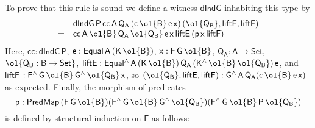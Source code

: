 \documentclass[sigplan,10pt]{acmart}
\begin{document}
To prove that this rule is sound we define a witness
$\mathsf{dIndG}$ inhabiting this type by
\[\begin{array}{ll}
 & \mathsf{dIndG\,P\,cc\,A\,Q_A\,(c\,\ol{B}\,e\,x)\,(\ol{Q_B}, liftE, liftF)}\\
= & \mathsf{cc\,A\,\ol{B}\,Q_A\,\ol{Q_B}\,e\,x\,liftE\,(p\,x\,liftF)}
\end{array}\]
Here, $\mathsf{cc : dIndC\,P}$, $\mathsf{e : Equal\,A\,(K\,\ol{B})}$,
$\mathsf{x : F\,G\,\ol{B}}$, $\mathsf{Q_A : A \to Set}$,
$\ol{\mathsf{Q_B : B \to Set}}$, $\mathsf{liftE :
  Equal^{\wedge}\,A\,(K\,\ol{B})\,Q_A\,
  (K^{\wedge}\,\ol{B}\,\ol{Q_B})\,e}$, and $\mathsf{liftF}$ $\mathsf{:
  F^{\wedge}\,G\,\ol{B}\,G^{\wedge}\,{\ol{Q_B}}\,x}$, so
$\mathsf{(\ol{Q_B}, liftE, liftF) : G^{\wedge}\,A\,Q_A (c\,\ol{B}\,
  e\,x)}$ as expected.  Finally, the morphism of predicates
\[\mathsf{p : PredMap\,(F\,G\,\ol{B}) (F^{\wedge}\,G\,\ol{B}\,G^{\wedge}\,\ol{Q_B})
  (F^{\wedge}\,G\,\ol{B}\,P\,\ol{Q_B})}\] is defined by structural
induction on $\mathsf{F}$ as follows:
\end{document}
